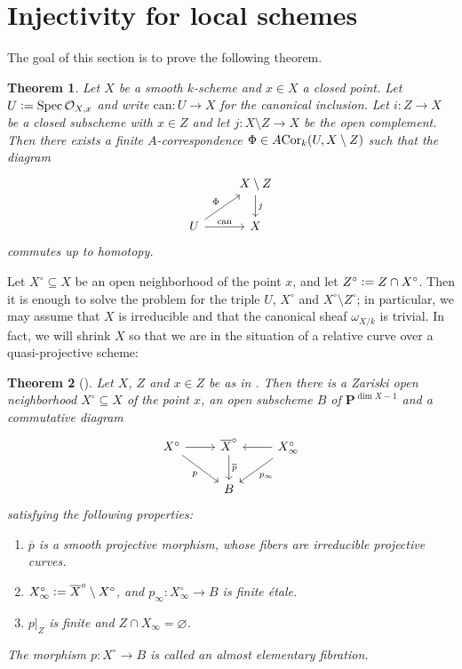 \documentclass[a4paper, oneside, english,reqno]{amsart}
\theoremstyle{plain}
\newtheorem{theorem}{Theorem}[section]
\theoremstyle{definition}
\theoremstyle{remark}
\newcommand{\ol}{\overline}
\newcommand{\defeq}{\vcentcolon=}
\newcommand{\ACor}{A\mkern-3mu\Cor}
\newcommand{\PP}{\mathbf{P}}
\newcommand{\calO}{\mathcal{O}}
\newcommand{\can}{\mathrm{can}}
\DeclareMathOperator{\Spec}{Spec}
\DeclareMathOperator{\Cor}{Cor}
\begin{document}
\section{Injectivity for local schemes}\label{section:inj-loc-sch}
The goal of this section is to prove the following theorem.

\begin{theorem}\label{thm:inj-loc-sch}
Let $X$ be a smooth $k$-scheme and $x\in X$ a closed point. Let $U\defeq\Spec\calO_{X,x}$ and write $\can\colon U\rightarrow X$ for the canonical inclusion. Let $i\colon Z\to X$ be a closed subscheme with $x\in Z$ and let $j\colon X\setminus Z\to X$ be the open complement. Then there exists a finite $A$-correspondence $\Phi\in\ACor_k(U,X\setminus Z)$ such that the diagram
\[\begin{tikzcd}
& X\setminus Z\ar[d,"j"]\\
U\ar[ur,"\Phi"]\ar[r,"\can"] & X
\end{tikzcd}\]
commutes up to homotopy.
\end{theorem}

Let $X^\circ\subseteq X$ be an open neighborhood of the point $x$, and let $Z^\circ\defeq Z\cap X^\circ$. Then it is enough to solve the problem for the triple $U$, $X^\circ$ and $X^\circ\setminus Z^\circ$; in particular, we may assume that $X$ is irreducible and that the canonical sheaf $\omega_{X/k}$ is trivial. In fact, we will shrink $X$ so that we are in the situation of a relative curve over a quasi-projective scheme:

\begin{theorem}[]
Let $X$, $Z$ and $x\in Z$ be as in . Then there is a Zariski open neighborhood $X^\circ\subseteq X$ of the point $x$, an open subscheme $B$ of $\PP^{\dim X-1}$ and a commutative diagram
\[\begin{tikzcd}
  X^\circ\ar[r]\ar[dr,swap,"p"] & \ol X^\circ\ar[d,"\ol p"] & X_\infty^\circ\ar[l,swap]\ar[dl,"p_\infty"]\\
& B &
\end{tikzcd}\]
satisfying the following properties:
\begin{enumerate}
\item[$(1)$] $\ol p$ is a smooth projective morphism, whose fibers are irreducible projective curves.
\item[$(2)$] $X^\circ_\infty\defeq\ol X^\circ\setminus X^\circ$, and $p_\infty\colon X^\circ_\infty\to B$ is finite étale.
\item[$(3)$] $p|_Z$ is finite and $Z\cap X_\infty=\varnothing$. 
\end{enumerate}
The morphism $p\colon X^\circ\to B$ is called an \em{almost elementary fibration}.
\end{theorem}
\end{document}
